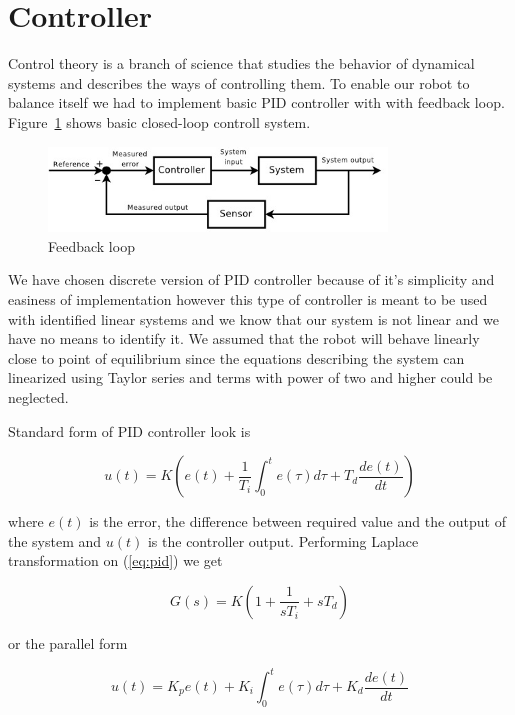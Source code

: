 \documentclass{article}
\begin{document}
\section{Controller}

Control theory is a branch of science that studies the behavior of dynamical
systems and describes the ways of controlling them. To enable our robot to
balance itself we had to implement basic PID controller with with feedback loop.
Figure~\ref{fig:loop} shows basic closed-loop controll system.

\begin{figure}[h]
    \centering
    \includegraphics[width=9cm]{loop}
    \caption{Feedback loop \cite{wloop}}
    \label{fig:loop}
\end{figure}

We have chosen discrete version of PID controller because of it's simplicity and
easiness of implementation however this type of controller is meant to be used
with identified linear systems and we know that our system is not linear and we
have no means to identify it. We assumed that the robot will behave linearly
close to point of equilibrium since the equations describing the system can
linearized using Taylor series and terms with power of two and higher could be
neglected.

Standard form of PID controller look is

\begin{equation} \label{eq:pid}
    u(t) = K \left( e(t) + \frac{1}{T_i} \int_0^t e(\tau)d\tau + T_d
        \frac{de(t)}{dt} \right)
\end{equation}

\noindent where $e(t)$ is the error, the difference between required value and
the output of the system and $u(t)$ is the controller output. Performing Laplace
transformation \cite{lt} on (\ref{eq:pid}) we get

\begin{equation}
    G(s) = K \left( 1 + \frac{1}{sT_i} + sT_d \right)
\end{equation}

\noindent or the parallel form

\begin{equation} \label{eq:para}
    u(t) =  K_pe(t) + K_i \int_0^t e(\tau)d\tau + K_d
        \frac{de(t)}{dt}\end{equation}
\end{document}
